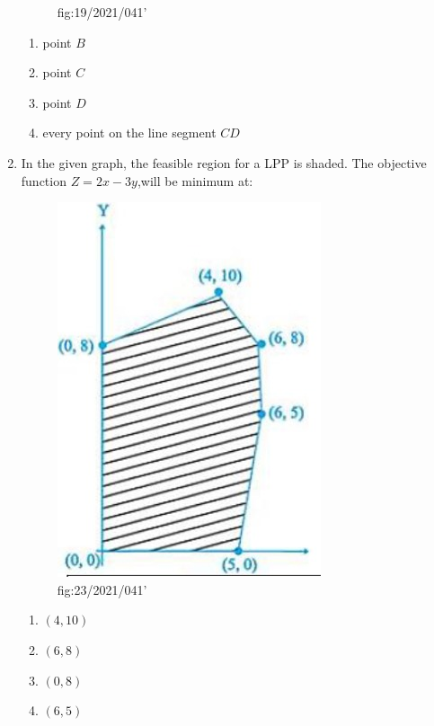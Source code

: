 \documentclass{article}
\begin{document}
\begin{enumerate}
\begin{figure}[h]
    \caption{fig:19/2021/041'}
\end{figure}
\begin{enumerate}
    \item point $B$
    \item point $C$
    \item point $D$
    \item every point on the line segment $CD$   
\end{enumerate}
\item In the given graph, the feasible region for a LPP is shaded.
The objective function 
$Z=2x-3y$,will be minimum at:
\begin{figure}[h]
    \centering{}
    \includegraphics[width=\columnwidth]{figs/fig2.jpg}
    
    \caption{fig:23/2021/041'}                                        \end{figure}
\begin{enumerate}
    \item $(4,10)$
    \item $(6,8)$
    \item $(0,8)$
    \item $(6,5)$
    \end{enumerate}
    
\end{enumerate}
\end{document}
